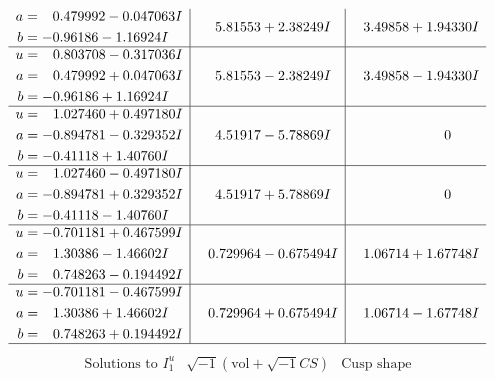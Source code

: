 \documentclass[1p]{elsarticle_modified}
\theoremstyle{definition}
\newcommand{\I}{\sqrt{-1}}
\begin{document}
$$\begin{array}{c|c|c}
\begin{aligned}
a &= \phantom{-}0.479992 - 0.047063 I \\
b &= -0.96186 - 1.16924 I\end{aligned}
 & \phantom{-}5.81553 + 2.38249 I & \phantom{-}3.49858 + 1.94330 I \\ \hline\begin{aligned}
u &= \phantom{-}0.803708 - 0.317036 I \\
a &= \phantom{-}0.479992 + 0.047063 I \\
b &= -0.96186 + 1.16924 I\end{aligned}
 & \phantom{-}5.81553 - 2.38249 I & \phantom{-}3.49858 - 1.94330 I \\ \hline\begin{aligned}
u &= \phantom{-}1.027460 + 0.497180 I \\
a &= -0.894781 - 0.329352 I \\
b &= -0.41118 + 1.40760 I\end{aligned}
 & \phantom{-}4.51917 - 5.78869 I & \phantom{-0.000000 } 0 \\ \hline\begin{aligned}
u &= \phantom{-}1.027460 - 0.497180 I \\
a &= -0.894781 + 0.329352 I \\
b &= -0.41118 - 1.40760 I\end{aligned}
 & \phantom{-}4.51917 + 5.78869 I & \phantom{-0.000000 } 0 \\ \hline\begin{aligned}
u &= -0.701181 + 0.467599 I \\
a &= \phantom{-}1.30386 - 1.46602 I \\
b &= \phantom{-}0.748263 - 0.194492 I\end{aligned}
 & \phantom{-}0.729964 - 0.675494 I & \phantom{-}1.06714 + 1.67748 I \\ \hline\begin{aligned}
u &= -0.701181 - 0.467599 I \\
a &= \phantom{-}1.30386 + 1.46602 I \\
b &= \phantom{-}0.748263 + 0.194492 I\end{aligned}
 & \phantom{-}0.729964 + 0.675494 I & \phantom{-}1.06714 - 1.67748 I\\
 \hline 
 \end{array}$$\newpage$$\begin{array}{c|c|c}  
\text{Solutions to }I^u_{1}& \I (\text{vol} + \sqrt{-1}CS) & \text{Cusp shape}\\
 \hline 
\begin{aligned}

\end{aligned}
\end{array}$$
\end{document}
